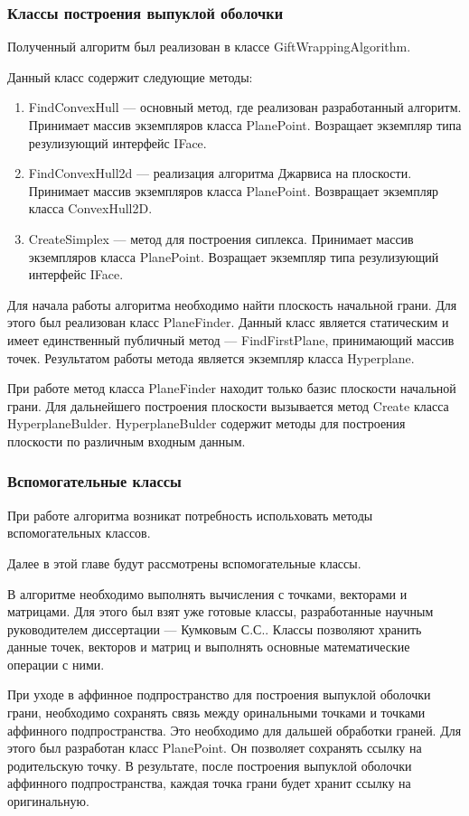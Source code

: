 \documentclass[14pt]{extarticle}
\begin{document}
\subsubsection{Классы построения выпуклой оболочки}
Полученный алгоритм был реализован в классе GiftWrappingAlgorithm.

Данный класс содержит следующие методы:
\begin{enumerate}[topsep=-0.5\parsep,itemsep=-0.5\parsep]
  \item FindConvexHull --- основный метод, где реализован разработанный алгоритм. Принимает массив экземпляров класса PlanePoint. Возращает экземпляр типа резулизующий интерфейс IFace.
  \item FindConvexHull2d --- реализация алгоритма Джарвиса на плоскости. Принимает массив экземпляров класса PlanePoint. Возвращает экземпляр класса ConvexHull2D.
  \item CreateSimplex --- метод для построения сиплекса. Принимает массив экземпляров класса PlanePoint. Возращает экземпляр типа резулизующий интерфейс IFace.
\end{enumerate}
\medskip

Для начала работы алгоритма необходимо найти плоскость начальной грани. Для этого был реализован класс PlaneFinder. Данный класс является статическим и имеет единственный публичный метод --- FindFirstPlane, принимающий массив точек. Результатом работы метода является экземпляр класса Hyperplane.

При работе метод класса PlaneFinder находит только базис плоскости начальной грани. Для дальнейшего построения плоскости вызывается метод Create класса HyperplaneBulder. HyperplaneBulder содержит методы для построения плоскости по различным входным данным.

\subsubsection{Вспомогательные классы}
При работе алгоритма возникат потребность испольховать методы вспомогательных классов.

Далее в этой главе будут рассмотрены вспомогательные классы.

В алгоритме необходимо выполнять вычисления с точками, векторами и матрицами. Для этого был взят уже готовые классы, разработанные научным руководителем диссертации --- Кумковым С.С.. Классы позволяют хранить данные точек, векторов и матриц и выполнять основные математические операции с ними.

При уходе в аффинное подпространство для построения выпуклой оболочки грани, необходимо сохранять связь между оринальными точками и точками аффинного подпространства. Это необходимо для дальшей обработки граней.  Для этого был разработан класс PlanePoint. Он позволяет сохранять ссылку на родительскую точку. В результате, после построения выпуклой оболочки аффинного подпространства, каждая точка грани будет хранит ссылку на оригинальную.
\end{document}

